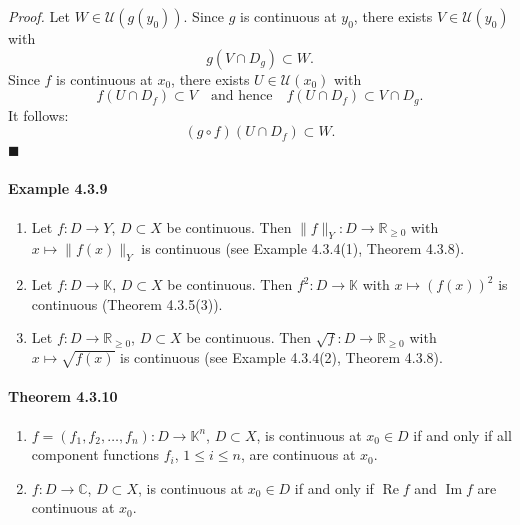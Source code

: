 \documentclass[12pt]{article}
\begin{document}
	\emph{Proof.} Let $W \in \mathcal U(g(y_0))$. Since $g$ is continuous at $y_0$, there exists $V \in \mathcal U(y_0)$ with
	\[
		g(V \cap D_g) \subset W.
	\]
	Since $f$ is continuous at $x_0$, there exists $U \in \mathcal U(x_0)$ with
	\[
		f(U \cap D_f) \subset V \quad \text{and hence}\quad f(U \cap D_f) \subset V \cap D_g.
	\]
	It follows:
	\[
		(g \circ f)(U \cap D_f) \subset W.
	\]
	\hfill $\blacksquare$

	\paragraph{Example 4.3.9}
	\begin{enumerate}[label=({\arabic*})]
		\item Let $f : D \to Y$, $D \subset X$ be continuous. Then $\|f\|_Y : D \to \mathbb R_{\ge 0}$ with $x \mapsto \|f(x)\|_Y$ is continuous (see Example 4.3.4(1), Theorem 4.3.8).
		\item Let $f : D \to \mathbb K$, $D \subset X$ be continuous. Then $f^2 : D \to \mathbb K$ with $x \mapsto (f(x))^2$ is continuous (Theorem 4.3.5(3)).
		\item Let $f : D \to \mathbb R_{\ge 0}$, $D \subset X$ be continuous. Then $\sqrt{f} : D \to \mathbb R_{\ge 0}$ with $x \mapsto \sqrt{f(x)}$ is continuous (see Example 4.3.4(2), Theorem 4.3.8).
	\end{enumerate}

	\paragraph{Theorem 4.3.10}
	\begin{enumerate}[label=({\arabic*})]
		\item $f = (f_1,f_2,\dots,f_n) : D \to \mathbb K^n$, $D \subset X$, is continuous at $x_0 \in D$ if and only if all component functions $f_i$, $1 \le i \le n$, are continuous at $x_0$.
		\item $f : D \to \mathbb C$, $D \subset X$, is continuous at $x_0 \in D$ if and only if $\operatorname{Re} f$ and $\operatorname{Im} f$ are continuous at $x_0$.
	\end{enumerate}
\end{document}
